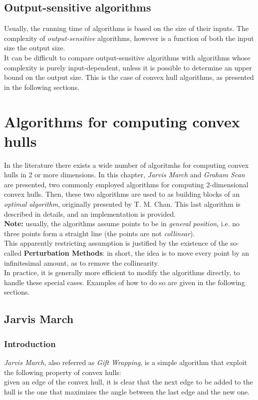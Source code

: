 \documentclass[
12pt,
a4paper,
oneside,
headinclude,
footinclude]{report}
\theoremstyle{definition} %
\begin{document}
\section{Output-sensitive algorithms}
Usually, the running time of algorithms is based on the size of their inputs. The complexity of \textit{output-sensitive} algorithms, however is a function of both the input size the output size. \cite{Chan1996}\\
It can be difficult to compare output-sensitive algorithms with algorithms whose complexity is purely input-dependent, unless it is possible to determine an upper bound on the output size.
This is the case of convex hull algorithms, as presented in the following sections.




\chapter{Algorithms for computing convex hulls}
In the literature there exists a wide number of algoritmhs for computing convex hulls in 2 or more dimensions. In this chapter, \textit{Jarvis March} and \textit{Graham Scan} are presented, two commonly employed algorithms for computing 2-dimensional convex hulls. Then, these two algorithms are used to as building blocks of an \textit{optimal algorithm}, originally presented by T. M. Chan. \cite{Chan1996}
This last algorithm is described in details, and an implementation is provided.\\

\textbf{Note:} usually, the algorithms assume points to be in \textit{general position}, i.e. no three points form a straight line (the points are not \textit{collinear}).\\
This apparently restricting assumption is justified by the existence of the so-called \textbf{Perturbation Methods}: in short, the idea is to move every point by an infinitesimal amount, as to remove the collinearity. \cite{Emiris:1991:EAR:894044}\\
In practice, it is generally more efficient to modify the algorithms directly, to handle these special cases. Examples of how to do so are given in the following sections.
\section{Jarvis March} 
\subsection{Introduction}
\textit{Jarvis March}, also referred as \textit{Gift Wrapping}, is a simple algorithm that exploit the following property of convex hulls:\\
given an edge of the convex hull, it is clear that the next edge to be added to the hull is the one that maximizes the angle between the last edge and the new one.\\
\end{document}
